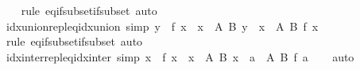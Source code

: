 \begin{isabellebody}
%
\isadelimproof
\ \ %
\endisadelimproof
%
\isatagproof
{}\isamarkupfalse%
\ {\isacharparenleft}{\kern0pt}rule\ eq{\isacharunderscore}{\kern0pt}if{\isacharunderscore}{\kern0pt}subset{\isacharunderscore}{\kern0pt}if{\isacharunderscore}{\kern0pt}subset{\isacharparenright}{\kern0pt}\ auto%
\endisatagproof
{\isafoldproof}%
%
\isadelimproof
\isanewline
%
\endisadelimproof
\isanewline
{}\isamarkupfalse%
\ idx{\isacharunderscore}{\kern0pt}union{\isacharunderscore}{\kern0pt}repl{\isacharunderscore}{\kern0pt}eq{\isacharunderscore}{\kern0pt}idx{\isacharunderscore}{\kern0pt}union\ {\isacharbrackleft}{\kern0pt}simp{\isacharbrackright}{\kern0pt}{\isacharcolon}{\kern0pt}\ {\isachardoublequoteopen}{\isacharparenleft}{\kern0pt}{\isasymUnion}y\ {\isasymin}\ {\isacharbraceleft}{\kern0pt}f\ x\ {\isacharbar}{\kern0pt}\ x\ {\isasymin}\ A{\isacharbraceright}{\kern0pt}{\isachardot}{\kern0pt}\ B\ y{\isacharparenright}{\kern0pt}\ {\isacharequal}{\kern0pt}\ {\isacharparenleft}{\kern0pt}{\isasymUnion}x\ {\isasymin}\ A{\isachardot}{\kern0pt}\ B\ {\isacharparenleft}{\kern0pt}f\ x{\isacharparenright}{\kern0pt}{\isacharparenright}{\kern0pt}{\isachardoublequoteclose}\isanewline
%
\isadelimproof
\ \ %
\endisadelimproof
%
\isatagproof
{}\isamarkupfalse%
\ {\isacharparenleft}{\kern0pt}rule\ eq{\isacharunderscore}{\kern0pt}if{\isacharunderscore}{\kern0pt}subset{\isacharunderscore}{\kern0pt}if{\isacharunderscore}{\kern0pt}subset{\isacharparenright}{\kern0pt}\ auto%
\endisatagproof
{\isafoldproof}%
%
\isadelimproof
\isanewline
%
\endisadelimproof
\isanewline
{}\isamarkupfalse%
\ idx{\isacharunderscore}{\kern0pt}inter{\isacharunderscore}{\kern0pt}repl{\isacharunderscore}{\kern0pt}eq{\isacharunderscore}{\kern0pt}idx{\isacharunderscore}{\kern0pt}inter\ {\isacharbrackleft}{\kern0pt}simp{\isacharbrackright}{\kern0pt}{\isacharcolon}{\kern0pt}\ {\isachardoublequoteopen}{\isacharparenleft}{\kern0pt}{\isasymInter}x\ {\isasymin}\ {\isacharbraceleft}{\kern0pt}f\ x\ {\isacharbar}{\kern0pt}\ x\ {\isasymin}\ A{\isacharbraceright}{\kern0pt}{\isachardot}{\kern0pt}\ B\ x{\isacharparenright}{\kern0pt}\ {\isacharequal}{\kern0pt}\ {\isacharparenleft}{\kern0pt}{\isasymInter}a\ {\isasymin}\ A{\isachardot}{\kern0pt}\ B\ {\isacharparenleft}{\kern0pt}f\ a{\isacharparenright}{\kern0pt}{\isacharparenright}{\kern0pt}{\isachardoublequoteclose}\isanewline
%
\isadelimproof
\ \ %
\endisadelimproof
%
\isatagproof
{}\isamarkupfalse%
\ auto%
\endisatagproof
{\isafoldproof}%
%
\isadelimproof
\isanewline
%
\endisadelimproof
\isanewline
{}\isamarkupfalse%

\end{isabellebody}

